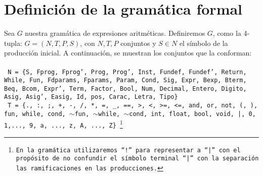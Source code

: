\documentclass[12pt]{article}
\begin{document}
\section{Definición de la gramática formal}

Sea $G$ nuestra gramática de expresiones aritméticas. Definiremos $G$, como la 4-tupla: $G = (N,T,P,S)$, con $N,T,P$ conjuntos y $S \in N$ el símbolo de la producción inicial.
A continuación, se muestran los conjuntos que la conforman:\\ \\
\texttt{ 
N = \{S, Fprog, Fprog', Prog, Prog', Inst, Fundef, Fundef', Return, While, Fun, Fdparams, Fparams, Param, Cond, Sig, Expr, Bexp, Bterm, Beq, Bcom, Expr', Term, Factor, Bool, Num, Decimal, Entero, Digito, Asig, Asig', Easig, Id, pos, Carac, Letra, Tipo\}
}\\

\texttt{
T = \{., :, ;, +, -, /, *, =, \_, ==, >, <, >=, <=, and, or, not, (, ), fun, while, cond, $\sim$fun, $\sim$while, $\sim$cond, int, float, bool, void, |, 0, 1,..., 9, a, ..., z, A, ..., Z\}  \footnote{En la gramática utilizaremos ``!'' para representar a ``|'' con el propósito de no confundir el símbolo terminal ``|'' con la separación las ramificaciones en las producciones.}
}\\
\end{document}
